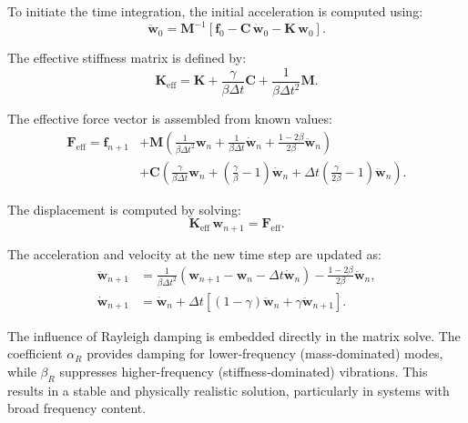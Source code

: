 \documentclass{article}
\begin{document}
	To initiate the time integration, the initial acceleration is computed using:
	\begin{equation}
		\ddot{\mathit{\mathbf{w}}}_0 = \mathit{\mathbf{M}}^{-1} \left[ \mathit{\mathbf{f}}_0 - \mathit{\mathbf{C}}\, \dot{\mathit{\mathbf{w}}}_0 - \mathit{\mathbf{K}}\, \mathit{\mathbf{w}}_0 \right].
	\end{equation}
	
	The effective stiffness matrix is defined by:
	\begin{equation}
		\mathit{\mathbf{K}}_{\text{eff}} = \mathit{\mathbf{K}} + \frac{\gamma}{\beta \Delta t} \mathit{\mathbf{C}} + \frac{1}{\beta \Delta t^2} \mathit{\mathbf{M}}.
	\end{equation}
	
	The effective force vector is assembled from known values:
	\begin{align}
		\mathit{\mathbf{F}}_{\text{eff}} = \mathit{\mathbf{f}}_{n+1}
		&+ \mathit{\mathbf{M}} \left( \frac{1}{\beta \Delta t^2} \mathit{\mathbf{w}}_n + \frac{1}{\beta \Delta t} \dot{\mathit{\mathbf{w}}}_n + \frac{1 - 2\beta}{2\beta} \ddot{\mathit{\mathbf{w}}}_n \right) \\
		&+ \mathit{\mathbf{C}} \left( \frac{\gamma}{\beta \Delta t} \mathit{\mathbf{w}}_n + \left( \frac{\gamma}{\beta} - 1 \right) \dot{\mathit{\mathbf{w}}}_n + \Delta t \left( \frac{\gamma}{2\beta} - 1 \right) \ddot{\mathit{\mathbf{w}}}_n \right).
	\end{align}
	
	The displacement is computed by solving:
	\begin{equation}
		\mathit{\mathbf{K}}_{\text{eff}}\, \mathit{\mathbf{w}}_{n+1} = \mathit{\mathbf{F}}_{\text{eff}}.
	\end{equation}
	
	The acceleration and velocity at the new time step are updated as:
	\begin{align}
		\ddot{\mathit{\mathbf{w}}}_{n+1} &= \frac{1}{\beta \Delta t^2} \left( \mathit{\mathbf{w}}_{n+1} - \mathit{\mathbf{w}}_n - \Delta t \dot{\mathit{\mathbf{w}}}_n \right) - \frac{1 - 2\beta}{2\beta} \ddot{\mathit{\mathbf{w}}}_n, \\
		\dot{\mathit{\mathbf{w}}}_{n+1} &= \dot{\mathit{\mathbf{w}}}_n + \Delta t \left[ (1 - \gamma) \ddot{\mathit{\mathbf{w}}}_n + \gamma \ddot{\mathit{\mathbf{w}}}_{n+1} \right].
	\end{align}
	
	The influence of Rayleigh damping is embedded directly in the matrix solve. The coefficient \( \alpha_R \) provides damping for lower-frequency (mass-dominated) modes, while \( \beta_R \) suppresses higher-frequency (stiffness-dominated) vibrations. This results in a stable and physically realistic solution, particularly in systems with broad frequency content.
	
\end{document}
